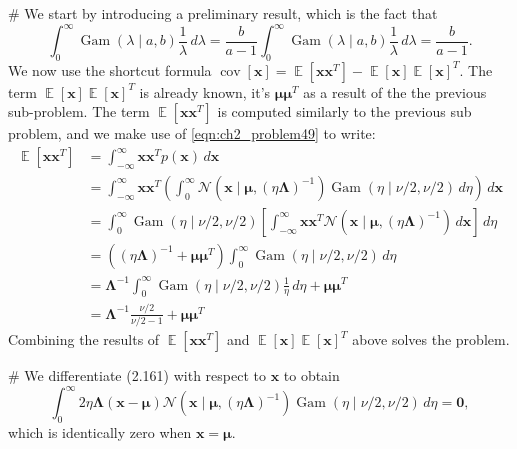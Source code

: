 \documentclass[12pt, a4paper]{article}
\newcommand{\vect}[1]{\bm{#1}}
\DeclareMathOperator{\E}{\mathbb{E}}
\DeclareMathOperator{\cov}{\operatorname{cov}}
\begin{document}
\begin{easylist}[enumerate]
	# We start by introducing a preliminary result, which is the fact that
	\begin{equation}
	\label{eqn:ch2_problem49}
		\int_{0}^{\infty} \operatorname{Gam}(\lambda \mid a, b) \frac{1}{\lambda} \, d \lambda = \frac{b}{a - 1} \int_{0}^{\infty} \operatorname{Gam}(\lambda \mid a, b) \frac{1}{\lambda} \, d \lambda = \frac{b}{a - 1}.
	\end{equation}
	We now use the shortcut formula $\cov\left[\vect{x}\right] = \E \left[ \vect{x} \vect{x}^T \right]
	-
	\E \left[ \vect{x}  \right] \E \left[ \vect{x}  \right]^T$.
	The term  $\E \left[ \vect{x}  \right] \E \left[ \vect{x}  \right]^T$ is already known, it's $\vect{\mu} \vect{\mu}^T$ as a result of the the previous sub-problem.
	The term $\E \left[ \vect{x} \vect{x}^T \right]$ is computed similarly to the previous sub problem, and we make use of \eqref{eqn:ch2_problem49} to write:
	\begin{align*}
	\E[ \vect{x} \vect{x}^T ] &= \int_{-\infty}^{\infty} \vect{x} \vect{x}^T  p(\vect{x} ) \, d\vect{x}  \\
	&= \int_{-\infty}^{\infty} \vect{x} \vect{x}^T 
	\left( 
	\int_{0}^{\infty}
	\mathcal{N}\left(\vect{x} \mid \vect{\mu},  (\eta \vect{\Lambda})^{-1}\right)
	\operatorname{Gam}\left(\eta \mid \nu /2, \nu / 2\right )
	\, d \eta
	\right) \, d\vect{x} \\
	&= 
	\int_{0}^{\infty}
	\operatorname{Gam}\left(\eta \mid \nu /2, \nu / 2\right )
	\left[ \int_{-\infty}^{\infty} \vect{x} \vect{x}^T
	\mathcal{N}\left(\vect{x} \mid \vect{\mu},  (\eta \vect{\Lambda})^{-1}\right)
	\, d\vect{x} \right] \, d \eta \\
	&= \left( (\eta \vect{\Lambda})^{-1} + \vect{\mu} \vect{\mu}^T \right)  \int_{0}^{\infty}
	\operatorname{Gam}\left(\eta \mid \nu /2, \nu / 2\right )
	\, d \eta \\
	&= \vect{\Lambda}^{-1} \int_{0}^{\infty}
	\operatorname{Gam}\left(\eta \mid \nu /2, \nu / 2\right ) \frac{1}{\eta}
	\, d \eta
	+ 
	\vect{\mu} \vect{\mu}^T \\
	&= \vect{\Lambda}^{-1} \frac{\nu/2}{\nu/2 - 1} + \vect{\mu} \vect{\mu}^T
	\end{align*}
	Combining the results of $\E \left[ \vect{x} \vect{x}^T \right]$ and $\E \left[ \vect{x}  \right] \E \left[ \vect{x}  \right]^T$ above solves the problem.

	
	# We differentiate (2.161) with respect to $\vect{x}$ to obtain
	\begin{equation*}
		\int_{0}^{\infty}
		 2 \eta \vect{\Lambda} (\vect{x} - \vect{\mu}) 
		\mathcal{N}\left(\vect{x} \mid \vect{\mu},  (\eta \vect{\Lambda})^{-1}\right)
		\operatorname{Gam}\left(\eta \mid \nu /2, \nu / 2\right )
		\, d \eta = \vect{0},
	\end{equation*}
	which is identically zero when $\vect{x} = \vect{\mu}$.
\end{easylist}
\end{document}
